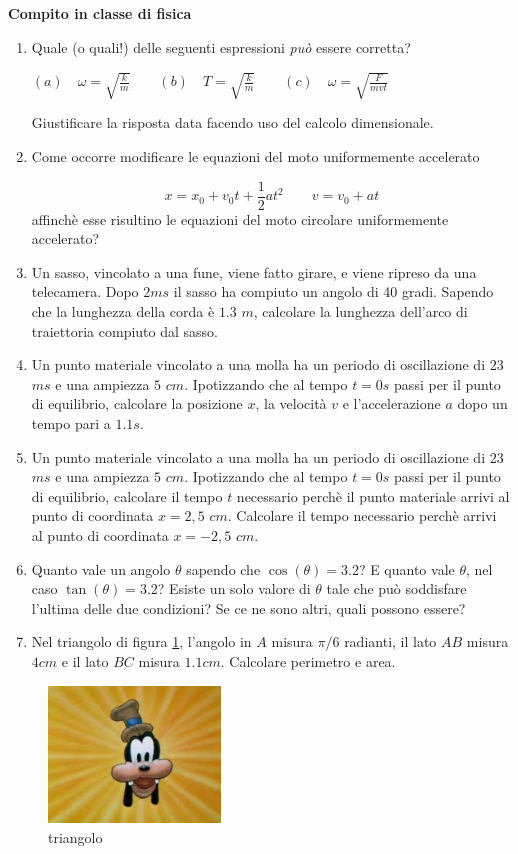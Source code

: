 \documentclass[14pt]{extarticle}
\begin{document}


\begin{center}
{\bf Compito in classe di fisica}
\end{center}

\begin{enumerate}
	\item Quale (o quali!) delle seguenti espressioni \emph{può} essere corretta?
	
		$(a)\quad\omega = \sqrt{\frac{k}{m}}
		\qquad (b)\quad T = \sqrt{\frac{k}{m}}
		\qquad (c)\quad \omega = \sqrt{\frac{F}{mvt}}$
			 
		Giustificare la risposta data facendo uso del calcolo dimensionale.
		
	\item Come occorre modificare le equazioni del moto uniformemente accelerato
	
	$$
		x = x_0 + v_0t +\frac{1}{2}at^2\qquad
		v = v_0 + at
	$$
	affinchè esse risultino le equazioni del moto circolare uniformemente accelerato?
	
	\item Un sasso, vincolato a una fune, viene fatto girare, e viene ripreso da una telecamera. Dopo $2ms$ il sasso ha compiuto un angolo di 40 gradi. Sapendo che la lunghezza della corda è $1.3$ $m$, calcolare la lunghezza dell'arco di traiettoria compiuto dal sasso.
	
	\item Un punto materiale vincolato a una molla ha un periodo di oscillazione di $23$ $ms$ e una ampiezza $5$ $cm$. Ipotizzando che al tempo $t = 0s$ passi per il punto di equilibrio, calcolare la posizione $x$, la velocità $v$ e l'accelerazione $a$ dopo un tempo pari a $1.1s$.

	\item Un punto materiale vincolato a una molla ha un periodo di oscillazione di $23$ $ms$ e una ampiezza $5$ $cm$. Ipotizzando che al tempo $t = 0s$ passi per il punto di equilibrio, calcolare il tempo $t$ necessario perchè il punto materiale arrivi al punto di coordinata $x = 2,5$ $cm$. Calcolare il tempo necessario perchè arrivi al punto di coordinata $x = -2,5$ $cm$.
	
	\item Quanto vale un angolo $\theta$ sapendo che $\cos(\theta) = 3.2$? E quanto vale $\theta$, nel caso $\tan(\theta) = 3.2$? Esiste un solo valore di $\theta$ tale che può soddisfare l'ultima delle due condizioni? Se ce ne sono altri, quali possono essere?

	\item Nel triangolo di figura \ref{fig:triangolo}, l'angolo in $A$ misura $\pi/6$ radianti, il lato $AB$ misura $4cm$ e il lato $BC$ misura $1.1cm$. Calcolare perimetro e area.
\end{enumerate}

\begin{figure}[h!]		
	\centering
   	\includegraphics[width=1.8in]{pippo.png}
  	\caption{triangolo}
   	\label{fig:triangolo}
\end{figure}
\end{document}
